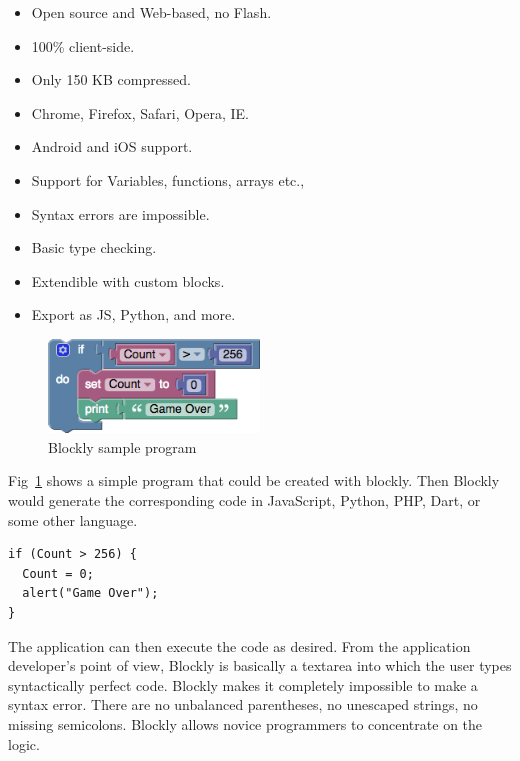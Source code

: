 \begin{itemize}
\item Open source and Web-based, no Flash.
\item 100\% client-side.
\item Only 150 KB compressed.
\item Chrome, Firefox, Safari, Opera, IE.
\item Android and iOS support.
\item Support for Variables, functions, arrays etc.,
\item Syntax errors are impossible.
\item Basic type checking.
\item Extendible with custom blocks.
\item Export as JS, Python, and more.
\end{itemize}

\begin{figure}
\centering
\includegraphics[width=0.5\textwidth]{assets/blockly_sample.png}
\caption[Blockly sample program]{Blockly sample program}
\label{fig:blockly_sample}
\end{figure}

Fig~\ref{fig:blockly_sample} shows a simple program that could be created with blockly. Then Blockly would generate the corresponding code in JavaScript, Python, PHP, Dart, or some other language.

\begin{verbatim}
if (Count > 256) {
  Count = 0;
  alert("Game Over");
}
\end{verbatim}

The application can then execute the code as desired. From the application developer's point of view, Blockly is basically a textarea into which the user types syntactically perfect code.  Blockly makes it completely impossible to make a syntax error. There are no unbalanced parentheses, no unescaped strings, no missing semicolons. Blockly allows novice programmers to concentrate on the logic.

